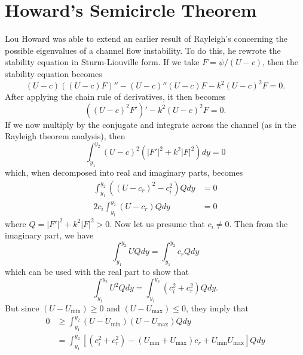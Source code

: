 \documentclass[letterpaper, 11pt, onecolumn]{article}
\begin{document}
\section{Howard's Semicircle Theorem}

Lou Howard was able to extend an earlier result of Rayleigh's concerning the possible eigenvalues of a channel flow instability. To do this, he rewrote the stability equation in Sturm-Liouville form. If we take $F = \psi / (U - c)$, then the stability equation becomes
\begin{equation*}
(U - c) ((U-c) F)'' - (U-c)'' (U-c) F - k^2 (U-c)^2 F = 0.
\end{equation*}
After applying the chain rule of derivatives, it then becomes
\begin{equation}
((U-c)^2 F')' - k^2 (U-c)^2 F = 0.
\end{equation}
If we now multiply by the conjugate and integrate across the channel (as in the Rayleigh theorem analysis), then
\begin{equation*}
\int_{y_1}^{y_2} (U - c)^2 \left(|F'|^2 + k^2 |F|^2 \right) dy = 0
\end{equation*}
which, when decomposed into real and imaginary parts, becomes
\begin{subequations}
\begin{align*}
\int_{y_1}^{y_2} \left((U-c_r)^2 - c_i^2\right) Q dy & = 0 \\
2 c_i \int_{y_1}^{y_2} (U - c_r) Q dy & = 0
\end{align*}
\end{subequations}
where $Q = |F'|^2 + k^2 |F|^2 > 0$. Now let us presume that $c_i \neq 0$. Then from the imaginary part, we have
\begin{equation*}
\int_{y_1}^{y_2} U Q dy = \int_{y_1}^{y_2} c_r Q dy
\end{equation*}
which can be used with the real part to show that
\begin{equation*}
\int_{y_1}^{y_2} U^2 Q dy = \int_{y_1}^{y_2} (c_i^2 + c_r^2) Q dy.
\end{equation*}
But since $(U - U_{\min}) \geq 0$ and $(U - U_{\max}) \leq 0$, they imply that
\begin{equation*}
\begin{split}
0 &\geq \int_{y_1}^{y_2} (U - U_{\min}) (U - U_{\max}) Q dy \\
&= \int_{y_1}^{y_2} \left[(c_i^2 + c_r^2) - (U_{\min} + U_{\max})c_r + U_{\min} U_{\max} \right] Q dy
\end{split}
\end{equation*}
\end{document}
